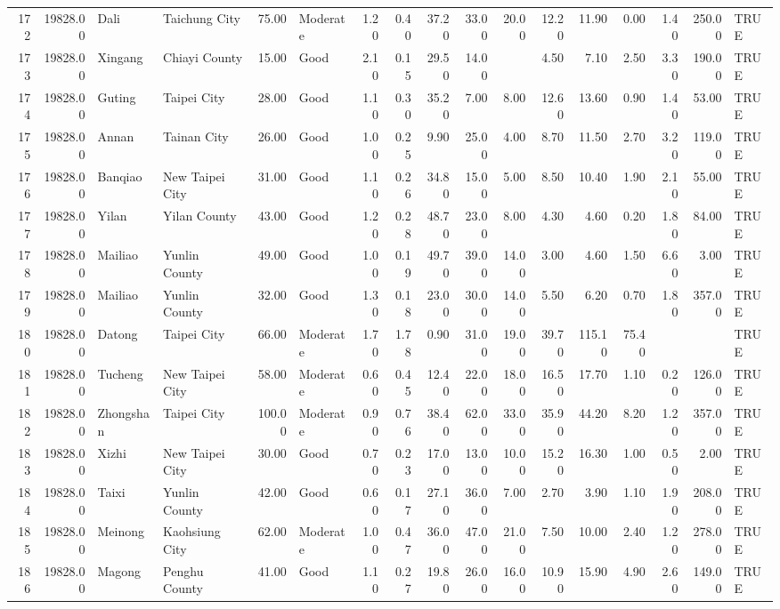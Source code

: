 \begin{table}[ht]
\begin{tabular}{rrllrlrrrrrrrrrrl}
  172 & 19828.00 & Dali & Taichung City & 75.00 & Moderate & 1.20 & 0.40 & 37.20 & 33.00 & 20.00 & 12.20 & 11.90 & 0.00 & 1.40 & 250.00 & TRUE \\ 
  173 & 19828.00 & Xingang & Chiayi County & 15.00 & Good & 2.10 & 0.15 & 29.50 & 14.00 &  & 4.50 & 7.10 & 2.50 & 3.30 & 190.00 & TRUE \\ 
  174 & 19828.00 & Guting & Taipei City & 28.00 & Good & 1.10 & 0.30 & 35.20 & 7.00 & 8.00 & 12.60 & 13.60 & 0.90 & 1.40 & 53.00 & TRUE \\ 
  175 & 19828.00 & Annan & Tainan City & 26.00 & Good & 1.00 & 0.25 & 9.90 & 25.00 & 4.00 & 8.70 & 11.50 & 2.70 & 3.20 & 119.00 & TRUE \\ 
  176 & 19828.00 & Banqiao & New Taipei City & 31.00 & Good & 1.10 & 0.26 & 34.80 & 15.00 & 5.00 & 8.50 & 10.40 & 1.90 & 2.10 & 55.00 & TRUE \\ 
  177 & 19828.00 & Yilan & Yilan County & 43.00 & Good & 1.20 & 0.28 & 48.70 & 23.00 & 8.00 & 4.30 & 4.60 & 0.20 & 1.80 & 84.00 & TRUE \\ 
  178 & 19828.00 & Mailiao & Yunlin County & 49.00 & Good & 1.00 & 0.19 & 49.70 & 39.00 & 14.00 & 3.00 & 4.60 & 1.50 & 6.60 & 3.00 & TRUE \\ 
  179 & 19828.00 & Mailiao & Yunlin County & 32.00 & Good & 1.30 & 0.18 & 23.00 & 30.00 & 14.00 & 5.50 & 6.20 & 0.70 & 1.80 & 357.00 & TRUE \\ 
  180 & 19828.00 & Datong & Taipei City & 66.00 & Moderate & 1.70 & 1.78 & 0.90 & 31.00 & 19.00 & 39.70 & 115.10 & 75.40 &  &  & TRUE \\ 
  181 & 19828.00 & Tucheng & New Taipei City & 58.00 & Moderate & 0.60 & 0.45 & 12.40 & 22.00 & 18.00 & 16.50 & 17.70 & 1.10 & 0.20 & 126.00 & TRUE \\ 
  182 & 19828.00 & Zhongshan & Taipei City & 100.00 & Moderate & 0.90 & 0.76 & 38.40 & 62.00 & 33.00 & 35.90 & 44.20 & 8.20 & 1.20 & 357.00 & TRUE \\ 
  183 & 19828.00 & Xizhi & New Taipei City & 30.00 & Good & 0.70 & 0.23 & 17.00 & 13.00 & 10.00 & 15.20 & 16.30 & 1.00 & 0.50 & 2.00 & TRUE \\ 
  184 & 19828.00 & Taixi & Yunlin County & 42.00 & Good & 0.60 & 0.17 & 27.10 & 36.00 & 7.00 & 2.70 & 3.90 & 1.10 & 1.90 & 208.00 & TRUE \\ 
  185 & 19828.00 & Meinong & Kaohsiung City & 62.00 & Moderate & 1.00 & 0.47 & 36.00 & 47.00 & 21.00 & 7.50 & 10.00 & 2.40 & 1.20 & 278.00 & TRUE \\ 
  186 & 19828.00 & Magong & Penghu County & 41.00 & Good & 1.10 & 0.27 & 19.80 & 26.00 & 16.00 & 10.90 & 15.90 & 4.90 & 2.60 & 149.00 & TRUE \\ 

\end{tabular}
\end{table}
